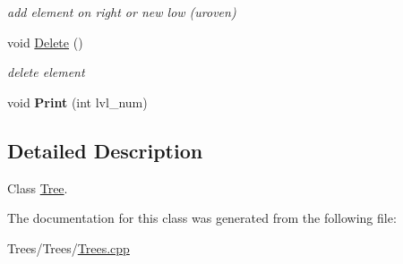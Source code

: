 \begin{DoxyCompactItemize}
\begin{DoxyCompactList}\small\item\em add element on right or new low (uroven) \end{DoxyCompactList}\item 
\hypertarget{class_tree_abd3851fdcbecc4106373beba6d20678f}{void \hyperlink{class_tree_abd3851fdcbecc4106373beba6d20678f}{Delete} ()}\label{class_tree_abd3851fdcbecc4106373beba6d20678f}

\begin{DoxyCompactList}\small\item\em delete element \end{DoxyCompactList}\item 
\hypertarget{class_tree_a098f048af1225614be0084f1baca8f59}{void {\bfseries Print} (int lvl\-\_\-num)}\label{class_tree_a098f048af1225614be0084f1baca8f59}

\end{DoxyCompactItemize}


\subsection{Detailed Description}
Class \hyperlink{class_tree}{Tree}. 

The documentation for this class was generated from the following file\-:\begin{DoxyCompactItemize}
\item 
Trees/\-Trees/\hyperlink{_trees_8cpp}{Trees.\-cpp}\end{DoxyCompactItemize}
